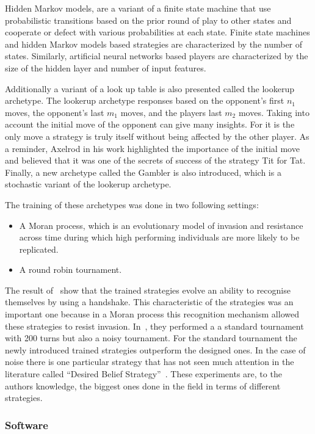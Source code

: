 \documentclass{article}
\theoremstyle{definition}
\begin{document}
Hidden Markov models, are a variant of a finite state machine that use probabilistic
transitions based on the prior round of play to other states and cooperate or
defect with various probabilities at each state. Finite state machines and hidden Markov models
based strategies are characterized by the number of states. Similarly, artificial
neural networks based players are characterized by the size of the hidden layer
and number of input features.

Additionally a variant of a look up table is also presented called the lookerup
archetype. The lookerup archetype responses based on the opponent's first \(n_1\)
moves, the opponent's last \(m_1\) moves, and the players last \(m_2\) moves.
Taking into account the initial move of the opponent can give many insights.
For it is the only move a strategy is truly itself without being affected by
the other player. As a reminder, Axelrod in his work highlighted the importance
of the initial move and believed that it was one of the secrets of success of the
strategy Tit for Tat. Finally, a new archetype called the Gambler is also introduced,
which is a stochastic variant of the lookerup archetype.

The training of these archetypes was done in two following settings:

\begin{itemize}
    \item A Moran process, which is an evolutionary model of invasion and resistance across
    time during which high performing individuals are more likely to be replicated.
    \item A round robin tournament.
\end{itemize}

The result of~\cite{KnightHGC17} show that the trained strategies evolve an ability
to recognise themselves by using a handshake. This characteristic of the strategies
was an important one because in a Moran process this recognition mechanism allowed these
strategies to resist invasion. In~\cite{Knight2017}, they performed a
a standard tournament with 200 turns but also a noisy tournament. For the standard
tournament the newly introduced trained strategies outperform the designed ones.
In the case of noise there is one particular strategy that has not seen much
attention in the literature called ``Desired Belief Strategy''~\cite{Au2006}.
These experiments are, to the authors knowledge, the biggest ones done in the
field in terms of different strategies.

\subsubsection{Software}
\end{document}
